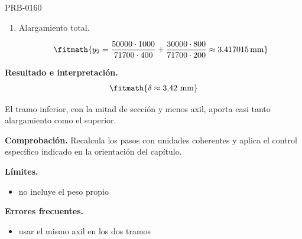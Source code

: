 \begin{studiumworked}{PRB-0160}
\begin{enumerate}
\[\fitmath{y_{1}=\frac{50000\cdot 1000}{71700\cdot 400}\approx 1.743375\,\mathrm{mm}}\]

\item Alargamiento total.

\[\fitmath{y_{2}=\frac{50000\cdot 1000}{71700\cdot 400}+\frac{30000\cdot 800}{71700\cdot 200}\approx 3.417015\,\mathrm{mm}}\]

\end{enumerate}

\textbf{Resultado e interpretación.}\[\fitmath{\delta \approx 3{,}42\ \mathrm{mm}}\]

El tramo inferior, con la mitad de sección y menos axil, aporta casi tanto alargamiento como el superior.

\par\textbf{Comprobación.} Recalcula los pasos con unidades coherentes y aplica el control específico indicado en la orientación del capítulo.

\textbf{Límites.}\begin{itemize}\item no incluye el peso propio\end{itemize}

\textbf{Errores frecuentes.}\begin{itemize}\item usar el mismo axil en los dos tramos\end{itemize}

\end{studiumworked}

\Needspace{.3\textheight}

